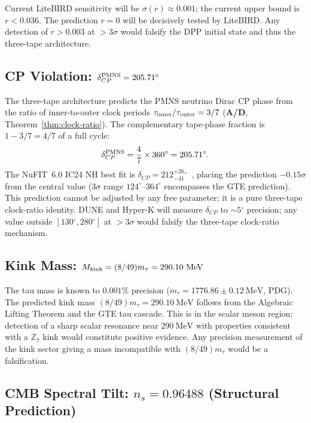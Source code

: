 \documentclass[11pt]{article}
\theoremstyle{remark}
\newcommand{\ZS}{\mathbb{Z}_7}
\newcommand{\mtau}{m_\tau}
\newcommand{\CatAD}{\textbf{A/D}}
\begin{document}
Current LiteBIRD sensitivity will be $\sigma(r) \approx 0.001$; the
current upper bound is $r < 0.036$. The prediction $r = 0$ will be
decisively tested by LiteBIRD. Any detection of $r > 0.003$ at $> 3\sigma$
would falsify the DPP initial state and thus the three-tape architecture.

\subsection{CP Violation: \texorpdfstring{$\delta_{CP}^{\rm PMNS} = 205.71{\ensuremath{{}^\circ}}$}{dCP}}

The three-tape architecture predicts the PMNS neutrino Dirac CP phase from
the ratio of inner-to-outer clock periods $\tau_{\rm inner}/\tau_{\rm outer} = 3/7$
(\CatAD, Theorem~\ref{thm:clock-ratio}).
The complementary tape-phase fraction is $1 - 3/7 = 4/7$ of a full cycle:
\begin{equation}
  \delta_{CP}^{\rm PMNS} = \frac{4}{7} \times 360{\ensuremath{{}^\circ}} = 205.71{\ensuremath{{}^\circ}}.
\end{equation}
The NuFIT~6.0 IC24 NH best fit is $\delta_{CP} = 212^{+26}_{-41}{}^\circ$~\cite{NuFIT60},
placing the prediction $-0.15\sigma$ from the central value ($3\sigma$ range
$124^\circ$--$364^\circ$ encompasses the GTE prediction). This prediction cannot be
adjusted by any free parameter; it is a pure three-tape clock-ratio identity.
DUNE and Hyper-K will measure $\delta_{CP}$ to $\sim 5{\ensuremath{{}^\circ}}$ precision; any
value outside $[130{\ensuremath{{}^\circ}}, 280{\ensuremath{{}^\circ}}]$ at $> 3\sigma$ would falsify the three-tape
clock-ratio mechanism.

\subsection{Kink Mass: \texorpdfstring{$M_{\rm kink} = (8/49)m_\tau = 290.10\ \text{MeV}$}{kink mass}}

The tau mass is known to $0.001\%$ precision ($\mtau = 1776.86 \pm 0.12\
\text{MeV}$, PDG). The predicted kink mass $(8/49)\mtau = 290.10\ \text{MeV}$
follows from the Algebraic Lifting Theorem and the GTE tau cascade. This
is in the scalar meson region; detection of a sharp scalar resonance near
$290\ \text{MeV}$ with properties consistent with a $\ZS$ kink would
constitute positive evidence. Any precision measurement of the kink sector
giving a mass incompatible with $(8/49)\mtau$ would be a falsification.

\subsection{CMB Spectral Tilt: \texorpdfstring{$n_s = 0.96488$}{ns} (Structural Prediction)}
\end{document}
